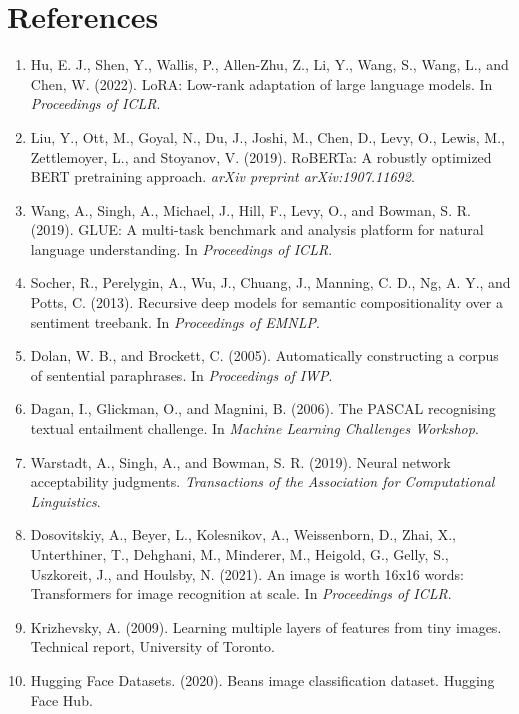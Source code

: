 \documentclass[11pt]{article}
\begin{document}
\clearpage
\section*{References}
\begin{enumerate}[leftmargin=1.2em,itemsep=0em]
    \item \label{ref:lora} Hu, E. J., Shen, Y., Wallis, P., Allen-Zhu, Z., Li, Y., Wang, S., Wang, L., and Chen, W. (2022). LoRA: Low-rank adaptation of large language models. In \textit{Proceedings of ICLR}.
    \item \label{ref:roberta} Liu, Y., Ott, M., Goyal, N., Du, J., Joshi, M., Chen, D., Levy, O., Lewis, M., Zettlemoyer, L., and Stoyanov, V. (2019). RoBERTa: A robustly optimized BERT pretraining approach. \textit{arXiv preprint arXiv:1907.11692}.
    \item \label{ref:glue} Wang, A., Singh, A., Michael, J., Hill, F., Levy, O., and Bowman, S. R. (2019). GLUE: A multi-task benchmark and analysis platform for natural language understanding. In \textit{Proceedings of ICLR}.
    \item \label{ref:sst2} Socher, R., Perelygin, A., Wu, J., Chuang, J., Manning, C. D., Ng, A. Y., and Potts, C. (2013). Recursive deep models for semantic compositionality over a sentiment treebank. In \textit{Proceedings of EMNLP}.
    \item \label{ref:mrpc} Dolan, W. B., and Brockett, C. (2005). Automatically constructing a corpus of sentential paraphrases. In \textit{Proceedings of IWP}.
    \item \label{ref:rte} Dagan, I., Glickman, O., and Magnini, B. (2006). The PASCAL recognising textual entailment challenge. In \textit{Machine Learning Challenges Workshop}.
    \item \label{ref:cola} Warstadt, A., Singh, A., and Bowman, S. R. (2019). Neural network acceptability judgments. \textit{Transactions of the Association for Computational Linguistics}.
    \item \label{ref:vit} Dosovitskiy, A., Beyer, L., Kolesnikov, A., Weissenborn, D., Zhai, X., Unterthiner, T., Dehghani, M., Minderer, M., Heigold, G., Gelly, S., Uszkoreit, J., and Houlsby, N. (2021). An image is worth 16x16 words: Transformers for image recognition at scale. In \textit{Proceedings of ICLR}.
    \item \label{ref:cifar10} Krizhevsky, A. (2009). Learning multiple layers of features from tiny images. Technical report, University of Toronto.
    \item \label{ref:beans} Hugging Face Datasets. (2020). Beans image classification dataset. Hugging Face Hub.

\end{enumerate}
\end{document}
